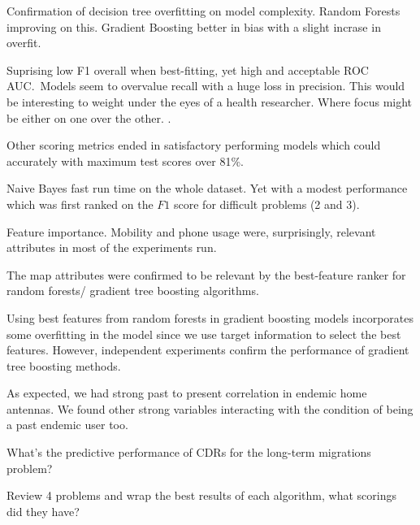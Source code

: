 \begin{description}
    \item Confirmation of decision tree overfitting on model complexity. Random Forests improving on this. Gradient Boosting better in bias with a slight incrase in overfit.
    \item Suprising low F1 overall when best-fitting, yet high and acceptable ROC AUC.\ Models seem to overvalue recall with a huge loss in precision. This would be interesting to weight under the eyes of a health researcher. Where focus might be either on one over the other. .
    \item Other scoring metrics ended in satisfactory performing models which could accurately with maximum test scores over 81\%.
    \item Naive Bayes fast run time on the whole dataset. Yet with a modest performance which was first ranked on the $F1$ score for difficult problems (2 and 3).
    \item [DONE] Feature importance. Mobility and phone usage were, surprisingly, relevant attributes in most of the experiments run.
    \item [DONE] The map attributes were confirmed to be relevant by the best-feature ranker for random forests/ gradient tree boosting algorithms.
    \item Using best features from random forests in gradient boosting models incorporates some overfitting in the model since we use target information to select the best features. However, independent experiments confirm the performance of gradient tree boosting methods.
    \item As expected, we had strong past to present correlation in endemic home antennas. We found other strong variables interacting with the condition of being a past endemic user too.
    \item What's the predictive performance of CDRs for the long-term migrations problem?
    \item Review 4 problems and wrap the best results of each algorithm, what scorings did they have?


\end{description}





